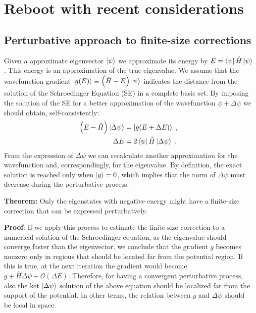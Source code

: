 \documentclass[a4paper]{article}
\newcommand{\op}[1]{\hat {#1}}
\begin{document}
\section{Reboot with recent considerations}
\subsection{Perturbative approach to finite-size corrections}
Given a approximate eigenvector $\ket{\psi}$ we approximate its energy by $E=\bra{\psi} \op H \ket{\psi}$.
This energy is an approximation of the true eigenvalue. We assume that the wavefunction gradient $\ket{g(E)}\equiv \left(\op H -E\right)\ket{\psi}$ indicates the distance from the solution of the Schroedinger Equation (SE) in a complete basis set.
By imposing the solution of the SE for a better approximation of the wavefunction $\psi + \Delta \psi$
we should obtain, self-consistently:
\begin{align}
\left(E -\op H \right)\ket{\Delta \psi} &= \ket{g(E+ \Delta E)}\;,\\
\Delta E &= 2 \bra{\psi} \op H \ket{\Delta \psi}\;.
\end{align}
From the expression of $\Delta \psi$ we can recalculate another approximation for the wavefunction and, correspondingly, for the eigenvalue.
By definition, the exact solution is reached only when $\ket{g}=0$, which implies that the norm of $\Delta \psi$ must decrease during the perturbative process.

\textbf{Theorem:} Only the eigenstates with negative energy might have a finite-size correction that can be expressed perturbatvely.

\textbf{Proof}: 
If we apply this process to estimate the finite-size correction to a numerical solution of the Schroedinger equation, as the eigenvalue should converge faster than the eigenvector, we conclude that the gradient $g$ becomes nonzero only in regions that  should be located far from the potential region. If this is true, at the next iteration the gradient would become $g + \op H \Delta \psi + \mathcal{O}(\Delta E)$.
Therefore, for having a convergent perturbative process, also the ket $\ket{\Delta \psi}$ solution of the above equation should be localized far from the support of the potential. In other terms, the relation between $g$ and $\Delta \psi$ should be local in space.
\end{document}
